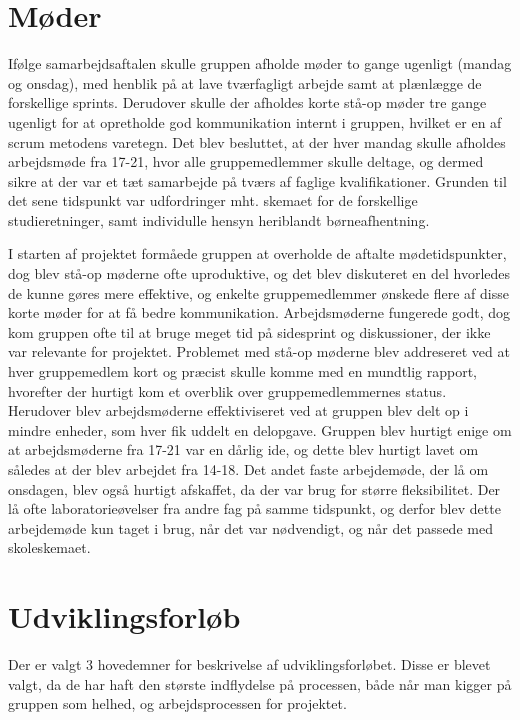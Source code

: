 \section{Møder}
Ifølge samarbejdsaftalen skulle gruppen afholde møder to gange ugenligt (mandag og onsdag), med henblik på at lave tværfagligt arbejde samt at plænlægge
de forskellige sprints. Derudover skulle der afholdes korte stå-op møder tre gange ugenligt for at opretholde god kommunikation internt i gruppen,
hvilket er en af scrum metodens varetegn.
Det blev besluttet, at der hver mandag skulle afholdes arbejdsmøde fra 17-21, hvor alle gruppemedlemmer skulle deltage, og dermed sikre at der var
et tæt samarbejde på tværs af faglige kvalifikationer. Grunden til det sene tidspunkt var udfordringer mht. skemaet for de forskellige studieretninger,
samt individulle hensyn heriblandt børneafhentning. 

I starten af projektet formåede gruppen at overholde de aftalte mødetidspunkter, dog blev stå-op møderne ofte uproduktive, og det blev diskuteret en del
hvorledes de kunne gøres mere effektive, og enkelte gruppemedlemmer ønskede flere af disse korte møder for at få bedre kommunikation. Arbejdsmøderne fungerede godt,
dog kom gruppen ofte til at bruge meget tid på sidesprint og diskussioner, der ikke var relevante for projektet.
Problemet med stå-op møderne blev addreseret ved at hver gruppemedlem kort og præcist skulle komme med en mundtlig rapport, hvorefter der hurtigt kom et overblik
over gruppemedlemmernes status. Herudover blev arbejdsmøderne effektiviseret ved at gruppen blev delt op i mindre enheder, som hver fik uddelt en delopgave. 
Gruppen blev hurtigt enige om at arbejdsmøderne fra 17-21 var en dårlig ide, og dette blev hurtigt lavet om således at der blev arbejdet fra 14-18.
Det andet faste arbejdemøde, der lå om onsdagen, blev også hurtigt afskaffet, da der var brug for større fleksibilitet. Der lå ofte laboratorieøvelser
fra andre fag på samme tidspunkt, og derfor blev dette arbejdemøde kun taget i brug, når det var nødvendigt, og når det passede med skoleskemaet.    

\section{Udviklingsforløb}
Der er valgt 3 hovedemner for beskrivelse af udviklingsforløbet. Disse er blevet valgt, da de har haft den største indflydelse på processen, 
både når man kigger på gruppen som helhed, og arbejdsprocessen for projektet.  

